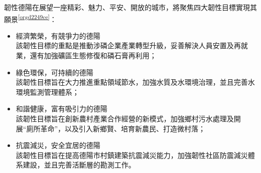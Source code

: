 \documentclass[a4paper,12pt]{article}
\begin{document}
\begin{enumerate}
韌性德陽在展望一座精彩、魅力、平安、開放的城市，將聚焦四大韌性目標實現其願景\textsuperscript{\ref{orgd2249ce}}：\\
\begin{itemize}
\item 經濟繁榮，有競爭力的德陽\\
該韌性目標的重點是推動涉磷企業產業轉型升級，妥善解決人員安置及再就業，還有加強礦區生態修復和磷石膏再利用；\\
\item 綠色環保，可持續的德陽\\
該韌性目標旨在大力推進重點領域節水，加強水質及水環境治理，並且完善水環境監測管理體系；\\
\item 和諧健康，富有吸引力的德陽\\
該韌性目標旨在創新農村產業合作經營的新模式，加強鄉村污水處理及開展``廁所革命''，以及引入新鄉賢、培育新農民、打造微村落；\\
\item 抗震減災，安全宜居的德陽\\
該韌性目標旨在提高德陽市村鎮建築抗震減災能力，加強韌性社區防震減災體系建設，並且完善活斷層的勘測工作。\\
\end{itemize}
\newpage
\end{enumerate}
\end{document}
